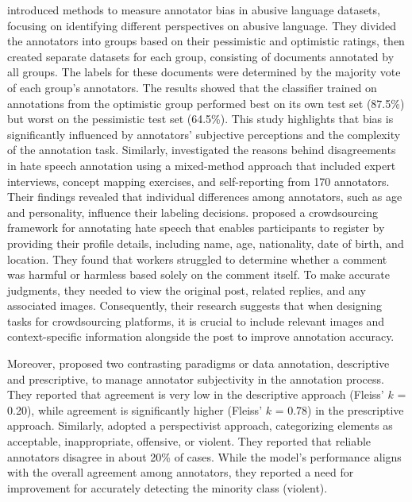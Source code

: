 \citet{Wich2021} introduced methods to measure annotator bias in abusive language datasets, focusing on identifying different perspectives on abusive language. They divided the annotators into groups based on their pessimistic and optimistic ratings, then created separate datasets for each group, consisting of documents annotated by all groups. The labels for these documents were determined by the majority vote of each group's annotators. The results showed that the classifier trained on annotations from the optimistic group performed best on its own test set (87.5\%) but worst on the pessimistic test set (64.5\%). This study highlights that bias is significantly influenced by annotators' subjective perceptions and the complexity of the annotation task. 
%
Similarly, \citet{Sang2022} investigated the reasons behind disagreements in hate speech annotation using a mixed-method approach that included expert interviews, concept mapping exercises, and self-reporting from 170 annotators. Their findings revealed that individual differences among annotators, such as age and personality, influence their labeling decisions.
%
\cite{Meedin2022} proposed a crowdsourcing framework for annotating hate speech that enables participants to register by providing their profile details, including name, age, nationality, date of birth, and location. They found that workers struggled to determine whether a comment was harmful or harmless based solely on the comment itself. To make accurate judgments, they needed to view the original post, related replies, and any associated images. Consequently, their research suggests that when designing tasks for crowdsourcing platforms, it is crucial to include relevant images and context-specific information alongside the post to improve annotation accuracy.
 
Moreover, \citet{Rottger2022} proposed two contrasting paradigms or data annotation, descriptive and prescriptive, to manage  annotator subjectivity in the annotation process. They reported that agreement is very low in the descriptive approach (Fleiss’ $k$ = 0.20), while agreement is significantly higher (Fleiss’ $k$ = 0.78) in the prescriptive approach.
Similarly, \citet{Novak2022} adopted a perspectivist approach, categorizing elements as acceptable, inappropriate, offensive, or violent. They reported that reliable annotators disagree in about 20\% of cases. While the model’s performance aligns with the overall agreement among annotators, they reported a need for improvement for accurately detecting the minority class (violent).

